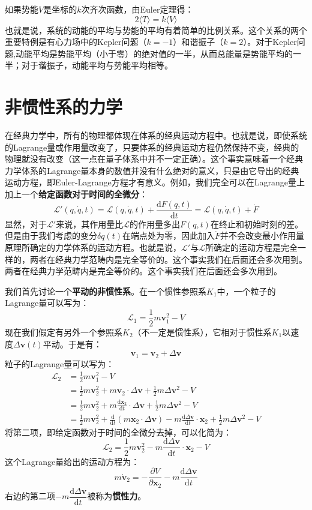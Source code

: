 \documentclass[a4paper,openany]{book}
\begin{document}
如果势能$V$是坐标的$k$次齐次函数，由Euler定理得：
\[
    2\langle T \rangle = k\langle V \rangle
\]
也就是说，系统的动能的平均与势能的平均有着简单的比例关系。这个关系的两个重要特例是有心力场中的Kepler问题（$k=-1$）和谐振子（$k=2$）。对于Kepler问题,动能平均是势能平均（小于零）的绝对值的一半，从而总能量是势能平均的一半；对于谐振子，动能平均与势能平均相等。

\chapter*{非惯性系的力学}

在经典力学中，所有的物理都体现在体系的经典运动方程中。也就是说，即使系统的Lagrange量或作用量改变了，只要体系的经典运动方程仍然保持不变，经典的物理就没有改变（这一点在量子体系中并不一定正确）。这个事实意味着一个经典力学体系的Lagrange量本身的数值并没有什么绝对的意义，只是由它导出的经典运动方程，即Euler-Lagrange方程才有意义。例如，我们完全可以在Lagrange量上加上一个\textbf{给定函数对于时间的全微分}：
\[
    \mathcal{L}'(q,\dot{q},t) = \mathcal{L}(q,\dot{q},t) + \frac{\mathrm{d}F(q,t)}{\mathrm{d}t} = \mathcal{L}(q,\dot{q},t) + \dot{F}
\]
显然，对于$\mathcal{L}'$来说，其作用量比$\mathcal{L}$的作用量多出$F(q,t)$在终止和初始时刻的差。但是由于我们考虑的变分$\delta q(t)$在端点处为零，因此加入$\dot{F}$并不会改变最小作用量原理所确定的力学体系的运动方程。也就是说，$\mathcal{L}'$与$\mathcal{L}$所确定的运动方程是完全一样的，两者在经典力学范畴内是完全等价的。这个事实我们在后面还会多次用到。两者在经典力学范畴内是完全等价的。这个事实我们在后面还会多次用到。

我们首先讨论一个\textbf{平动的非惯性系}。在一个惯性参照系$K_1$中，一个粒子的Lagrange量可以写为：
\[
    \mathcal{L}_1 = \frac{1}{2}m\bm{v}_1^2 - V
\]
现在我们假定有另外一个参照系$K_2$（不一定是惯性系），它相对于惯性系$K_1$以速度$\Delta\bm{v}(t)$平动。于是有：
\[
    \bm{v}_1 = \bm{v}_2 + \Delta\bm{v}
\]
粒子的Lagrange量可以写为：
\begin{align*}
    \mathcal{L}_2
    &= \frac{1}{2}m\bm{v}_1^2 - V \\
    &= \frac{1}{2}m\bm{v}_2^2 + m\bm{v}_2\cdot\Delta\bm{v} + \frac{1}{2}m\Delta\bm{v}^2 - V \\
    &= \frac{1}{2}m\bm{v}_2^2 + m\frac{\mathrm{d}\bm{x}_2}{\mathrm{d}t}\cdot\Delta\bm{v} + \frac{1}{2}m\Delta\bm{v}^2 - V \\
    &= \frac{1}{2}m\bm{v}_2^2 + \frac{\mathrm{d}}{\mathrm{d}t}(m\bm{x}_2\cdot\Delta\bm{v}) - m\frac{\mathrm{d}\Delta\bm{v}}{\mathrm{d}t}\cdot\bm{x}_2 + \frac{1}{2}m\Delta\bm{v}^2 - V
\end{align*}
将第二项，即给定函数对于时间的全微分去掉，可以化简为：
\[
    \mathcal{L}_2 = \frac{1}{2}m\bm{v}_2^2 - m\frac{\mathrm{d}\Delta\bm{v}}{\mathrm{d}t}\cdot\bm{x}_2 - V
\]
这个Lagrange量给出的运动方程为：
\[
    \boxed{m\bm{\dot{v}}_2 = -\frac{\partial V}{\partial\bm{x}_2} - m\frac{\mathrm{d}\Delta\bm{v}}{\mathrm{d}t}}
\]
右边的第二项$\boxed{-m\dfrac{\mathrm{d}\Delta\bm{v}}{\mathrm{d}t}}$被称为\textbf{惯性力}。
\end{document}
